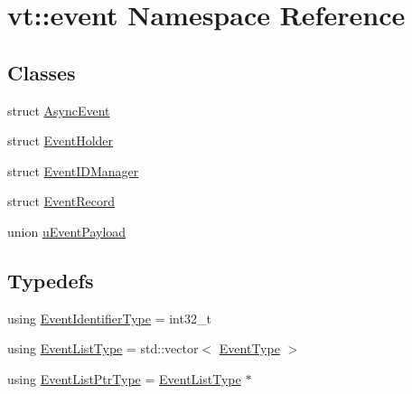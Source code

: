 \hypertarget{namespacevt_1_1event}{}\section{vt\+:\+:event Namespace Reference}
\label{namespacevt_1_1event}
\subsection*{Classes}
\begin{DoxyCompactItemize}
\item 
struct \hyperlink{structvt_1_1event_1_1_async_event}{Async\+Event}
\item 
struct \hyperlink{structvt_1_1event_1_1_event_holder}{Event\+Holder}
\item 
struct \hyperlink{structvt_1_1event_1_1_event_i_d_manager}{Event\+I\+D\+Manager}
\item 
struct \hyperlink{structvt_1_1event_1_1_event_record}{Event\+Record}
\item 
union \hyperlink{unionvt_1_1event_1_1u_event_payload}{u\+Event\+Payload}
\end{DoxyCompactItemize}
\subsection*{Typedefs}
\begin{DoxyCompactItemize}
\item 
using \hyperlink{namespacevt_1_1event_a0893245b7a220f3fe6951382e3038afa}{Event\+Identifier\+Type} = int32\+\_\+t
\item 
using \hyperlink{namespacevt_1_1event_a7b4d125173ad6453b505d06927581933}{Event\+List\+Type} = std\+::vector$<$ \hyperlink{namespacevt_a009267401def7ae8bf201892222d060f}{Event\+Type} $>$
\item 
using \hyperlink{namespacevt_1_1event_aa507caad8ea8ee959ccef2d57753dceb}{Event\+List\+Ptr\+Type} = \hyperlink{namespacevt_1_1event_a7b4d125173ad6453b505d06927581933}{Event\+List\+Type} $\ast$
\end{DoxyCompactItemize}
